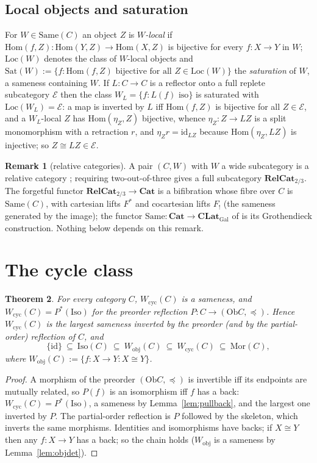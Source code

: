 \documentclass[11pt]{amsart}
\newtheorem{thm}{Theorem}[section]
\theoremstyle{definition}
\newtheorem{rem}[thm]{Remark}
\newcommand{\Same}{\mathrm{Same}}
\newcommand{\Mor}{\mathrm{Mor}}
\newcommand{\Iso}{\mathrm{Iso}}
\newcommand{\Hom}{\mathrm{Hom}}
\newcommand{\Ob}{\mathrm{Ob}}
\newcommand{\Loc}{\mathrm{Loc}}
\newcommand{\Sat}{\mathrm{Sat}}
\newcommand{\Wcyc}{W_{\mathrm{cyc}}}
\newcommand{\Wobj}{W_{\mathrm{obj}}}
\newcommand{\Cat}{\mathbf{Cat}}
\begin{document}
\subsection{Local objects and saturation}
For $W\in\Same(C)$ an object $Z$ is \emph{$W$-local} if $\Hom(f,Z)\colon
\Hom(Y,Z)\to\Hom(X,Z)$ is bijective for every $f\colon X\to Y$ in $W$;
$\Loc(W)$ denotes the class of $W$-local objects and
$\Sat(W):=\{f:\Hom(f,Z)\text{ bijective for all }Z\in\Loc(W)\}$ the
\emph{saturation} of $W$, a sameness containing $W$. If $L\colon C\to C$ is a
reflector onto a full replete subcategory $\mathcal E$ then the class
$W_L=\{f:L(f)\text{ iso}\}$ is saturated with $\Loc(W_L)=\mathcal E$: a map is
inverted by $L$ iff $\Hom(f,Z)$ is bijective for all $Z\in\mathcal E$, and a
$W_L$-local $Z$ has $\Hom(\eta_Z,Z)$ bijective, whence $\eta_Z\colon Z\to LZ$ is
a split monomorphism with a retraction $r$, and $\eta_Zr=\mathrm{id}_{LZ}$ because
$\Hom(\eta_Z,LZ)$ is injective; so $Z\cong LZ\in\mathcal E$.

\begin{rem}[relative categories]\label{rem:relcat}
A pair $(C,W)$ with $W$ a wide subcategory is a relative category
\cite{BK}; requiring two-out-of-three gives a full subcategory
$\mathbf{RelCat}_{2/3}$. The forgetful functor $\mathbf{RelCat}_{2/3}\to\Cat$ is a
bifibration whose fibre over $C$ is $\Same(C)$, with cartesian lifts $F^*$
and cocartesian lifts $F_!$ (the sameness generated by the image); the
functor $\Same\colon\Cat\to\mathbf{CLat}_{\mathrm{Gal}}$ of \cite{Same} is its
Grothendieck construction. Nothing below depends on this remark.
\end{rem}

\section{The cycle class}\label{sec:cyc}

\begin{thm}\label{thm:cyc}
For every category $C$, $\Wcyc(C)$ is a sameness, and
$\Wcyc(C)=P^*(\Iso)$ for the preorder reflection $P\colon C\to(\Ob C,\preceq)$.
Hence $\Wcyc(C)$ is the largest sameness inverted by the preorder (and by
the partial-order) reflection of $C$, and
\[
\{\mathrm{id}\}\ \subseteq\ \Iso(C)\ \subseteq\ \Wobj(C)\ \subseteq\ \Wcyc(C)\ \subseteq\ \Mor(C),
\]
where $\Wobj(C):=\{f\colon X\to Y: X\cong Y\}$.
\end{thm}
\begin{proof}
A morphism of the preorder $(\Ob C,\preceq)$ is invertible iff its endpoints
are mutually related, so $P(f)$ is an isomorphism iff $f$ has a back:
$\Wcyc(C)=P^*(\Iso)$, a sameness by Lemma~\ref{lem:pullback}, and the largest
one inverted by $P$. The partial-order reflection is $P$ followed by the
skeleton, which inverts the same morphisms. Identities and isomorphisms have
backs; if $X\cong Y$ then any $f\colon X\to Y$ has a back; so the chain holds
($\Wobj$ is a sameness by Lemma~\ref{lem:objdet}).
\end{proof}
\end{document}
